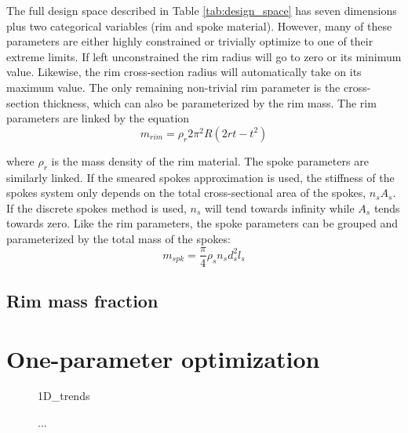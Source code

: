 \documentclass[\rootdir/thesis.tex]{subfiles}
\begin{document}
The full design space described in Table \ref{tab:design_space} has seven dimensions plus two categorical variables (rim and spoke material). However, many of these parameters are either highly constrained or trivially optimize to one of their extreme limits. If left unconstrained the rim radius will go to zero or its minimum value. Likewise, the rim cross-section radius will automatically take on its maximum value. The only remaining non-trivial rim parameter is the cross-section thickness, which can also be parameterized by the rim mass. The rim parameters are linked by the equation
\begin{equation}
\label{eq:m_rim}
m_{rim} = \rho_r 2\pi^2 R (2rt - t^2)
\end{equation}

where $\rho_r$ is the mass density of the rim material. The spoke parameters are similarly linked. If the smeared spokes approximation is used, the stiffness of the spokes system only depends on the total cross-sectional area of the spokes, $n_sA_s$. If the discrete spokes method is used, $n_s$ will tend towards infinity while $A_s$ tends towards zero. Like the rim parameters, the spoke parameters can be grouped and parameterized by the total mass of the spokes:
\begin{equation}
\label{eq:m_spokes}
m_{spk} = \frac{\pi}{4} \rho_s n_s d_s^2 l_s
\end{equation}

\subsection{Rim mass fraction}


\section{One-parameter optimization}

\begin{figure}
\centering
{1D_trends}
\caption{...}
\label{fig:opt_1D_trends}
\end{figure}

\inprogress
\end{document}

